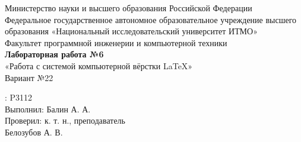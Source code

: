 \begin{center}
    \Large Министерство науки и высшего образования Российской Федерации \\
     Федеральное государственное автономное образовательное учреждение высшего образования «Национальный исследовательский университет ИТМО» \\
     \vspace{18pt}
     Факультет программной инженерии и компьютерной техники\\
     \vspace{84pt}
     \LARGE \textbf {Лабораторная работа №6}\\
     \vspace{8pt}
     \Large «Работа с системой компьютерной вёрстки \LaTeX»\\
     \vspace{30pt}
     Вариант №22\\
     \vspace{160pt}
\end{center}
\begin{flushright}
\begin{minipage}{0.45\textwidth}
    : P3112\\\vspace{8pt}Выполнил: Балин А. А.\\
    Проверил: к. т. н., преподаватель\\Белозубов А. В.\\
\end{minipage}
\end{flushright}